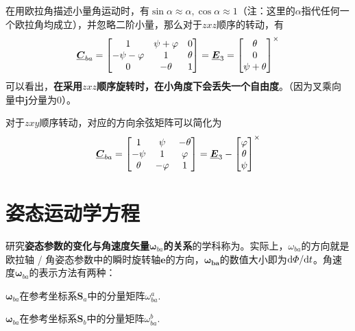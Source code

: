 \sssection[用欧拉角表示的姿态矩阵]

在用欧拉角描述小量角运动时，有$\sin \alpha \approx \alpha, \cos \alpha \approx 1$（注：这里的$\alpha$指代任何一个欧拉角均成立），并忽略二阶小量，那么对于$zxz$顺序的转动，有
\begin{equation}
	\underline{\bm{C}}_{ba} = 
	\begin{bmatrix}
		1 & \psi + \varphi & 0 \\
		- \psi - \varphi & 1 & \theta \\
		0 & - \theta & 1
	\end{bmatrix}
	= 
	\underline{\bm{E}}_3 = 
	\begin{bmatrix}
		\theta \\
		0 \\
		\psi + \theta 
	\end{bmatrix}^\times
\end{equation}
可以看出，\textbf{在采用$zxz$顺序旋转时，在小角度下会丢失一个自由度}。（因为叉乘向量中$\bm{j}$分量为0）。

对于$zxy$顺序转动，对应的方向余弦矩阵可以简化为
\begin{equation}
	\underline{\bm{C}}_{ba} = 
	\begin{bmatrix}
		1 & \psi & -\theta \\
		-\psi & 1 & \varphi \\
		\theta & - \varphi & 1
	\end{bmatrix}
	=
	\underline{\bm{E}}_3 - 
	\begin{bmatrix}
		\varphi \\
		\theta \\
		\psi
	\end{bmatrix}^\times
\end{equation}



\section{姿态运动学方程}

研究\textbf{姿态参数的变化与角速度矢量$\bm{\omega}_{ba}$的关系}的学科称为。实际上，$\omega_{ba}$的方向就是欧拉轴 / 角姿态参数中的瞬时旋转轴$\bm{e}$的方向，$\bm{\omega_{ba}}$的数值大小即为${\rm{d}} \varPhi / {\rm{d}} t$。角速度$\bm{\omega}_{ba}$的表示方法有两种：

\noa[1] $\bm{\omega}_{ba}$在参考坐标系$\bm{S}_a$中的分量矩阵$\omega_{ba}^a$.

\noa[2] $\bm{\omega}_{ba}$在参考坐标系$\bm{S}_b$中的分量矩阵$\omega_{ba}^b$.
\vspace*{0.5em}

